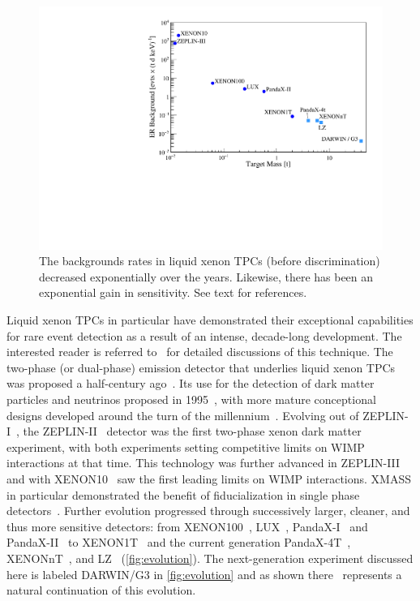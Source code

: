 \begin{figure}[!htbp]
\begin{center}
\includegraphics[width=0.9\columnwidth]{fig_evolution.pdf}
\caption{The backgrounds rates in liquid xenon TPCs (before discrimination) decreased exponentially over the years. Likewise, there has been an exponential gain in sensitivity. See text for references.}\label{fig:evolution}
\end{center}
\end{figure}

Liquid xenon TPCs in particular have demonstrated their exceptional capabilities for rare event detection as a result of an intense, decade-long development. The interested reader is referred to~\cite{Bolozdynya:2010, Akimov:2021} for detailed discussions of this technique. The two-phase (or dual-phase) emission detector that underlies liquid xenon TPCs was proposed a half-century ago~\cite{Dolgoshein:1970}. Its use for the detection of dark matter particles and neutrinos proposed in 1995~\cite{Bolozdynya:1995}, with more mature conceptional designs developed around the turn of the millennium~\cite{Cline:2000, Aprile:2002ef}. Evolving out of ZEPLIN-I~\cite{Alner:2005pa}, the ZEPLIN-II~\cite{Alner:2007ja} detector was the first two-phase xenon dark matter experiment, with both experiments setting competitive limits on WIMP interactions at that time. This technology was further advanced in ZEPLIN-III~\cite{Lebedenko:2008gb,Araujo:2011as} and with XENON10~\cite{Angle:2007uj} saw the first leading limits on WIMP interactions. XMASS in particular demonstrated the benefit of fiducialization in single phase detectors~\cite{XMASS:2018bid}. Further evolution progressed through successively larger, cleaner, and thus more sensitive detectors: from XENON100~\cite{Aprile:2011dd,Aprile:2012nq}, LUX~\cite{Akerib:2016vxi}, PandaX-I~\cite{Xiao:2014xyn} and PandaX-II~\cite{Wang:2020coa} to XENON1T~\cite{Aprile:2018dbl} and the current generation PandaX-4T~\cite{Zhang:2018xdp}, XENONnT~\cite{Aprile:2020vtw}, and LZ~\cite{Akerib:2018lyp} (\autoref{fig:evolution}). The next-generation experiment discussed here is labeled DARWIN/G3 in \autoref{fig:evolution} and as shown there~\cite{Schumann:2015cpa} represents a natural continuation of this evolution.


